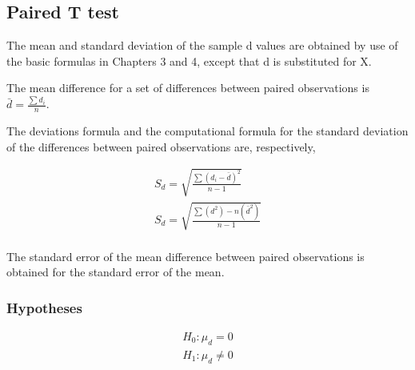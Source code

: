 \subsection{Paired T test}
The mean and standard deviation of the sample d values are
obtained by use of the basic formulas in Chapters 3 and 4, except
that d is substituted for X.

The mean difference for a set of differences between paired
observations is $\bar{d} = \frac{\sum d_{i}}{n}$.

The deviations formula and the computational formula for the
standard deviation of the differences between paired observations
are, respectively,

\begin{eqnarray}
S_{d} = \sqrt{\frac{\sum (d_{i}-\bar{d})^2}{n-1}}\\
S_{d} = \sqrt{\frac{ \sum (d^2)- n(\bar{d}^2)}{n-1}}\\
\end{eqnarray}

The standard error of the mean difference between paired
observations is obtained for the standard error of the mean.
\subsubsection{Hypotheses}
\begin{eqnarray*}
H_{0}: \mu_{d} = 0\\
H_{1}: \mu_{d} \neq 0\\
\end{eqnarray*}



